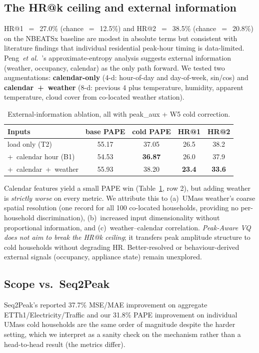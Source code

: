 \documentclass[conference]{IEEEtran}
\begin{document}
\subsection{The HR@k ceiling and external information}\label{sec:hrk}
HR@1~$=$~27.0\% (chance~$=$~12.5\%) and HR@2~$=$~38.5\%
(chance~$=$~20.8\%) on the NBEATSx baseline are modest in absolute terms but
consistent with literature findings that individual residential peak-hour
timing is data-limited.
Peng~\textit{et al.}~\cite{peng2019aggregation}'s approximate-entropy
analysis suggests external information (weather, occupancy, calendar) as
the only path forward. We tested two augmentations:
\textbf{calendar-only} (4-d: hour-of-day and day-of-week, sin/cos)
and \textbf{calendar~+~weather} (8-d: previous 4 plus temperature, humidity,
apparent temperature, cloud cover from co-located weather station).

\begin{table}[t]
\caption{External-information ablation, all with peak\_aux + W5 cold
correction.}
\label{tab:external}
\centering
\small
\begin{tabular}{l c c c c}
\toprule
Inputs & base PAPE & cold PAPE & HR@1 & HR@2 \\
\midrule
load only (T2) & 55.17 & 37.05 & 26.5 & 38.2 \\
+~calendar hour (B1) & 54.53 & \textbf{36.87} & 26.0 & 37.9 \\
+~calendar~+~weather & 55.93 & 38.20 & \textbf{23.4} & \textbf{33.6} \\
\bottomrule
\end{tabular}
\end{table}

Calendar features yield a small PAPE win (Table~\ref{tab:external}, row 2),
but adding weather is \emph{strictly worse} on every metric. We attribute
this to (a)~UMass weather's coarse spatial resolution (one record for all
100 co-located households, providing no per-household discrimination),
(b)~increased input dimensionality without proportional information,
and (c)~weather--calendar correlation. \emph{Peak-Aware VQ does not aim
to break the HR@k ceiling}; it transfers peak amplitude structure to cold
households without degrading HR. Better-resolved or behaviour-derived
external signals (occupancy, appliance state) remain unexplored.

\subsection{Scope vs.\ Seq2Peak}
Seq2Peak's reported 37.7\% MSE/MAE improvement on aggregate
ETTh1/Electricity/Traffic and our 31.8\% PAPE improvement on individual
UMass cold households are the same order of magnitude despite the harder
setting, which we interpret as a sanity check on the mechanism rather than
a head-to-head result (the metrics differ).
\end{document}
